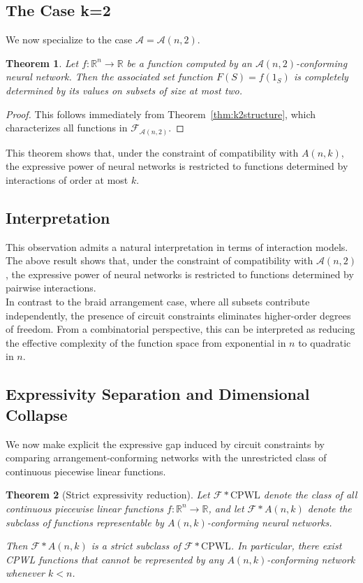 \documentclass{amsart}
\newtheorem{theorem}{Theorem}[section]
\theoremstyle{definition}
\begin{document}
\subsection{The Case k=2}

We now specialize to the case $\mathcal{A} = \mathcal{A}(n,2)$.

\begin{theorem}
Let $f : \mathbb{R}^n \to \mathbb{R}$ be a function computed by an $\mathcal{A}(n,2)$-conforming neural network. Then the associated set function $F(S) = f(1_S)$ is completely determined by its values on subsets of size at most two.
\end{theorem}

\begin{proof}
This follows immediately from Theorem~\ref{thm:k2structure}, which characterizes all functions in $\mathcal{F}_{\mathcal{A}(n,2)}$.
\end{proof}
\noindent
This theorem shows that, under the constraint of compatibility with $A(n,k)$, the expressive power of neural networks is restricted to functions determined by interactions of order at most $k$.

\subsection{Interpretation}
This observation admits a natural interpretation in terms of interaction models. The above result shows that, under the constraint of compatibility with $\mathcal{A}(n,2)$, the expressive power of neural networks is restricted to functions determined by pairwise interactions.\\
\noindent
In contrast to the braid arrangement case, where all subsets contribute independently, the presence of circuit constraints eliminates higher-order degrees of freedom. From a combinatorial perspective, this can be interpreted as reducing the effective complexity of the function space from exponential in $n$ to quadratic in $n$.
\subsection{ Expressivity Separation and Dimensional Collapse}

We now make explicit the expressive gap induced by circuit constraints by comparing arrangement-conforming networks with the unrestricted class of continuous piecewise linear functions.

\begin{theorem}[Strict expressivity reduction]
Let $\mathcal{F}*{\mathrm{CPWL}}$ denote the class of all continuous piecewise linear functions $f : \mathbb{R}^n \to \mathbb{R}$, and let $\mathcal{F}*{A(n,k)}$ denote the subclass of functions representable by $A(n,k)$-conforming neural networks.

Then $\mathcal{F}*{A(n,k)}$ is a strict subclass of $\mathcal{F}*{\mathrm{CPWL}}$. In particular, there exist CPWL functions that cannot be represented by any $A(n,k)$-conforming network whenever $k < n$.
\end{theorem}
\end{document}
